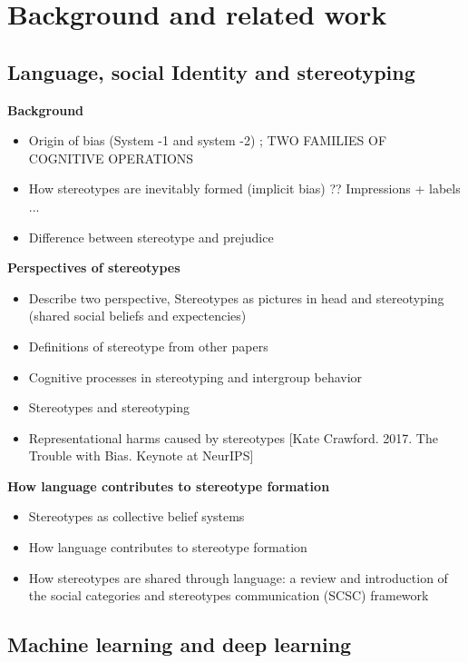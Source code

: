 \chapter{Background and related work}

\section{Language, social Identity and stereotyping}

\textbf{Background}
\begin{itemize}
    \item Origin of bias (System -1 and system -2) ; TWO FAMILIES OF COGNITIVE OPERATIONS \cite{kahneman2002representativeness}
    \item  How stereotypes are inevitably formed (implicit bias) ??
    Impressions + labels ...
    \cite{fiske1998stereotyping}
    \item Difference between stereotype and prejudice \cite{fiske1998stereotyping}
\end{itemize}
\textbf{Perspectives of stereotypes}
\begin{itemize}
    \item Describe two perspective, Stereotypes as pictures in head and stereotyping (shared social beliefs and expectencies) 
    \item Definitions of stereotype from other papers
    \item Cognitive processes in stereotyping and intergroup behavior \cite{hamilton2015cognitive}
    \item Stereotypes and stereotyping \cite{macrae1996stereotypes}
    \item Representational harms caused by stereotypes [Kate Crawford. 2017. The Trouble with Bias. Keynote
at NeurIPS]
\end{itemize}
\textbf{How language contributes to stereotype formation}
    \begin{itemize}
        \item Stereotypes as collective belief systems \cite{macrae1996stereotypes}
        \item How language contributes to stereotype formation \cite{burgers2020language}
        \item How stereotypes are shared through language: a
    review and introduction of the social categories
    and stereotypes communication (SCSC) framework \cite{beukeboom2019stereotypes}
    \end{itemize}
\section{Machine learning and deep learning}

